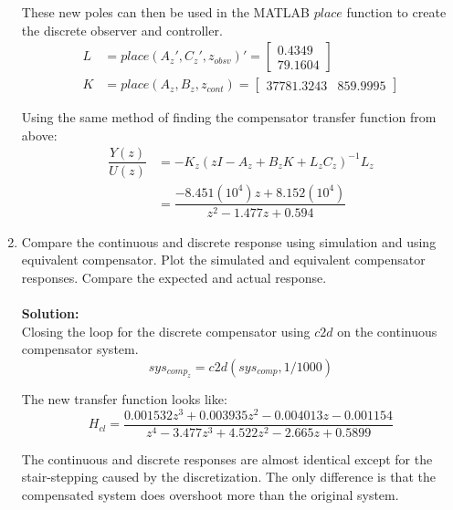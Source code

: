 \documentclass[11pt]{article}
\newcommand{\solution}{\textbf{Solution: \\}}
\begin{document}
\begin{enumerate}[label=\textbf{\arabic*.}]
  These new poles can then be used in the MATLAB $place$ function to create the 
  discrete observer and controller.
  \vspace{24pt}
  \begin{equation}
    \begin{split}
      L &= place(A_z', C_z', z_{obsv})' = 
      \begin{bmatrix}
        0.4349 \\ 79.1604
      \end{bmatrix} \\
      K &= place(A_z, B_z, z_{cont}) =
      \begin{bmatrix}
        37781.3243 & 859.9995
      \end{bmatrix}
    \end{split}
  \end{equation}

  Using the same method of finding the compensator transfer function from above:
  \begin{equation}
    \begin{split}
      \dfrac{Y(z)}{U(z)} &= -K_z(zI - A_z + B_zK + L_zC_z)^{-1}L_z \\
      &= \dfrac{-8.451(10^4)z + 8.152(10^4)}{z^2 - 1.477z + 0.594}
    \end{split}
  \end{equation}

  \vspace{24pt}
  \item Compare the continuous and discrete response using simulation and using 
  equivalent compensator. Plot the simulated and equivalent compensator responses. 
  Compare the expected and actual response. \\ \\ 
  \solution
  Closing the loop for the discrete compensator using $c2d$ on the continuous 
  compensator system.
  \begin{equation}
    sys_{comp_z} = c2d(sys_{comp}, 1/1000)
  \end{equation}

  The new transfer function looks like:
  \begin{equation*}
    H_{cl} = \dfrac{0.001532z^3+0.003935z^2-0.004013z-0.001154}
                  {z^4-3.477z^3+4.522z^2-2.665z+0.5899}
  \end{equation*}

  The continuous and discrete responses are almost identical except for the 
  stair-stepping caused by the discretization. The only difference is that the 
  compensated system does overshoot more than the original system.


\end{enumerate}
\end{document}
